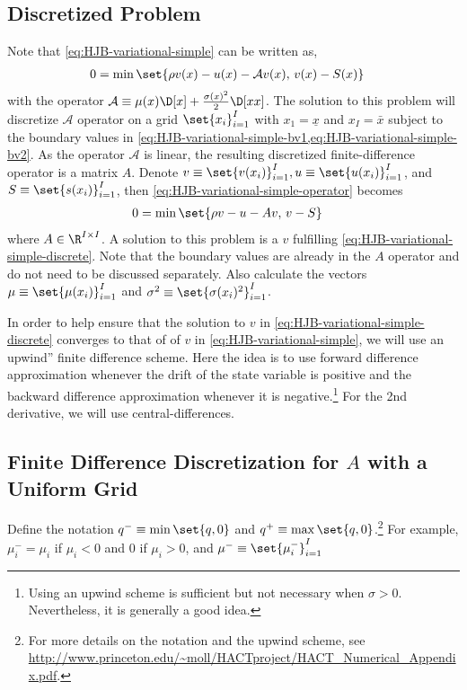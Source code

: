 \documentclass[11pt]{etk-article}
\begin{document}
\subsection{Discretized Problem}
Note that \cref{eq:HJB-variational-simple} can be written as,
\begin{align}
	0 &= \min\set{\rho v(x) - u(x) - \mathcal{A} v(x),\, v(x) - S(x) }\label{eq:HJB-variational-simple-operator}
\end{align}	
with the operator $\mathcal{A} \equiv \mu(x)\D[x] + \frac{\sigma(x)^2}{2}\D[xx]$.  The solution to this problem will discretize $\mathcal{A}$ operator on a grid $\set{x_i}_{i=1}^I$ with $x_1 = \underline{x}$ and $x_I = \bar{x}$ subject to the boundary values in \cref{eq:HJB-variational-simple-bv1,eq:HJB-variational-simple-bv2}.  As the operator $\mathcal{A}$ is linear, the resulting discretized finite-difference operator is a matrix $A$.  Denote $v \equiv \set{v(x_i)}_{i=1}^I, u \equiv \set{u(x_i)}_{i=1}^I$, and $S \equiv \set{s(x_i)}_{i=1}^I$, then \cref{eq:HJB-variational-simple-operator} becomes
\begin{align}
	0 &= \min\set{\rho v - u - A v,\, v - S }\label{eq:HJB-variational-simple-discrete}
\end{align}
where $A\in\R^{I\times I}$.  A solution to this problem is a $v$ fulfilling \cref{eq:HJB-variational-simple-discrete}.  Note that the boundary values are already in the $A$ operator and do not need to be discussed separately.  Also calculate the vectors $\mu \equiv \set{\mu(x_i)}_{i=1}^I$ and $\sigma^2 \equiv \set{\sigma(x_i)^2}_{i=1}^I$.  

In order to help ensure that the solution to $v$ in \cref{eq:HJB-variational-simple-discrete} converges to that of of $v$ in \cref{eq:HJB-variational-simple}, we will use an upwind'' finite difference scheme.  Here the idea is to use forward difference approximation whenever the drift of the state variable is positive and the backward difference approximation whenever it is negative.\footnote{Using an upwind scheme is sufficient but not necessary when $\sigma > 0$.  Nevertheless, it is generally a good idea.}  For the 2nd derivative, we will use central-differences.


\subsection{Finite Difference Discretization for $A$ with a Uniform Grid}
Define the notation $q^{-} \equiv \min\set{q,0}$ and $q^{+} \equiv \max\set{q,0}$.\footnote{For more details on the notation and the upwind scheme, see \url{http://www.princeton.edu/~moll/HACTproject/HACT_Numerical_Appendix.pdf}.}  For example, $\mu_i^{-} = \mu_i$ if $\mu_i < 0$ and $0$ if $\mu_i > 0$, and $\mu^{-} \equiv \set{\mu^{-}_i}_{i=1}^{I}$
\end{document}
